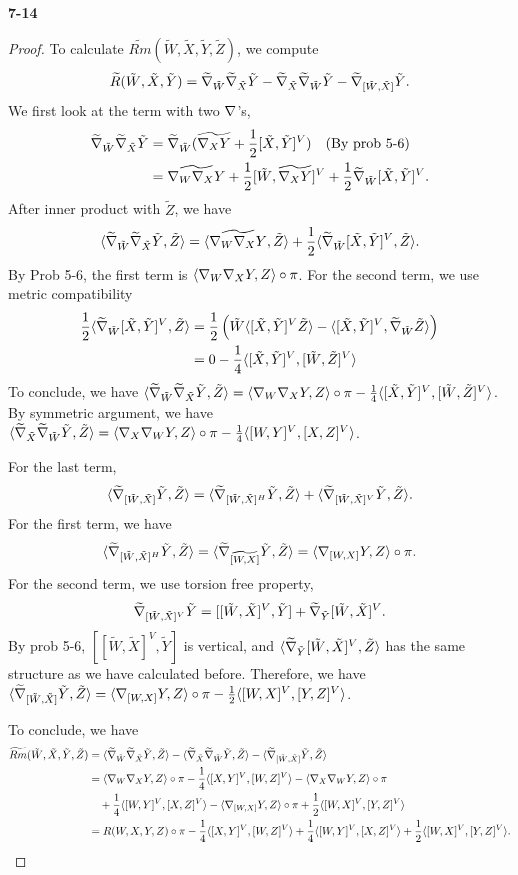 \documentclass[11pt, a4paper]{article}
\theoremstyle{plain}
\theoremstyle{definition}
\theoremstyle{remark}
\begin{document}
\noindent\textbf{7-14}
\newcommand{\trm}[4]{\widetilde{Rm}(\tilde#1,\tilde#2,\tilde#3,\tilde#4)}
\newcommand{\tr}[3]{\widetilde{R}(\tilde#1,\tilde#2,\tilde#3)}
\newcommand{\mt}[1]{\langle #1 \rangle}
\newcommand{\tx}{\tilde X}
\newcommand{\ty}{\tilde Y}
\newcommand{\tz}{\tilde Z}
\newcommand{\tw}{\tilde W}
\newcommand{\tn}{\widetilde{\n}}
\newcommand{\wt}{\widetilde}
\newcommand{\hlf}{\frac{1}{2}}
\newcommand{\qd}{\frac{1}{4}}
\begin{proof}
    To calculate $\trm{W}{X}{Y}{Z}$, we compute
    \[\tr{W}{X}{Y}=\tn_{\tw}\tn_{\tx}\ty - \tn_{\tx}\tn_{\tw}\ty - \tn_{[\tw,\tx]}\ty.\]
    We first look at the term with two $\nabla$'s,
    \begin{align*}
        \tn_{\tw}\tn_{\tx}\ty &= \tn_{\tw}(\wt{\n_X Y} + \hlf [\tx,\ty]^V)\quad\text{(By prob 5-6)}\\
        &= \wt{\n_W\n_X Y} + \hlf [\tw,\wt{\n_X Y}]^V + \hlf \tn_{\tw}[\tx,\ty]^V.
    \end{align*}
    After inner product with $\tz$, we have
    \[\mt{\tn_{\tw}\tn_{\tx}\ty,\tz} = \mt{\wt{\n_W\n_X Y},\tz} + \hlf\mt{\tn_{\tw} [\tx,\ty]^V,\tz}.\]
    By Prob 5-6, the first term is $\mt{\n_W\n_X Y,Z}\circ\pi$. For the second term, we use metric compatibility
    \begin{align*}
        \hlf\mt{\tn_{\tw} [\tx,\ty]^V,\tz} &= \hlf\left(\tw\mt{[\tx,\ty]^V\tz} - \mt{[\tx,\ty]^V,\tn_{\tw}\tz}\right)\\
        &= 0 - \qd\mt{[\tx,\ty]^V,[\tw,\tz]^V}
    \end{align*} 
    To conclude, we have $\mt{\tn_{\tw}\tn_{\tx}\ty,\tz} = \mt{\n_W\n_X Y,Z}\circ\pi -\qd\mt{[\tx,\ty]^V,[\tw,\tz]^V}$.
    \newcommand{\cm}[4]{\mt{[#1,#2]^V,[#3,#4]^V}}
    By symmetric argument, we have $\mt{\tn_{\tx}\tn_{\tw}\ty,\tz} = \mt{\n_X\n_W Y,Z}\circ\pi -\qd\cm{W}{Y}{X}{Z}$.

    For the last term, 
    \[\mt{\tn_{[\tw,\tx]}\ty,\tz} = \mt{\tn_{[\tw,\tx]^H}\ty,\tz}+\mt{\tn_{[\tw,\tx]^V}\ty,\tz}.\]
    For the first term, we have
    \[\mt{\tn_{[\tw,\tx]^H}\ty,\tz} = \mt{\tn_{\wt{[W,X]}}\ty,\tz} = \mt{\n_{[W,X]} Y,Z}\circ\pi.\]
    For the second term, we use torsion free property,
    \[\tn_{[\tw,\tx]^V}\ty = [[\tw,\tx]^V,\ty] + \tn_{\ty} [\tw,\tx]^V.\]
    By prob 5-6, $[[\tw,\tx]^V,\ty]$ is vertical, and $\mt{\tn_{\ty} [\tw,\tx]^V,\tz}$ has the same structure as we have calculated before.
    Therefore, we have $\mt{\tn_{[\tw,\tx]}\ty,\tz} = \mt{\n_{[W,X]} Y,Z}\circ\pi - \hlf\cm{W}{X}{Y}{Z}$.

    To conclude, we have
    \begin{align*}
        \trm{W}{X}{Y}{Z} &= \mt{\tn_{\tw}\tn_{\tx}\ty,\tz} - \mt{\tn_{\tx}\tn_{\tw}\ty,\tz} - \mt{\tn_{[\tw,\tx]}\ty,\tz}\\
                        &= \mt{\n_W\n_X Y,Z}\circ\pi -\qd\cm{X}{Y}{W}{Z} - \mt{\n_X\n_W Y,Z}\circ\pi \\ &\quad +\qd\cm{W}{Y}{X}{Z} - \mt{\n_{[W,X]} Y,Z}\circ\pi + \hlf\cm{W}{X}{Y}{Z}\\
                        &= R(W,X,Y,Z)\circ\pi - \qd\cm{X}{Y}{W}{Z} + \qd\cm{W}{Y}{X}{Z} + \hlf\cm{W}{X}{Y}{Z}.
                        \end{align*}
\end{proof}
\end{document}
